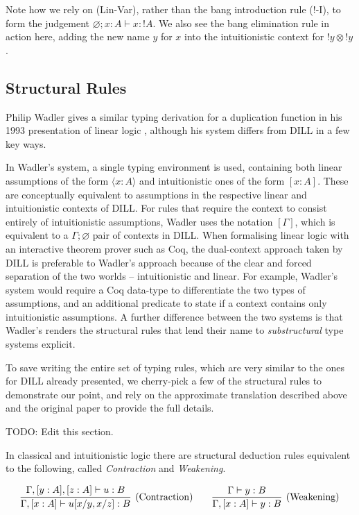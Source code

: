 \documentclass[]{unswthesis}
\let\emptyset\varnothing
\newcommand{\types}{\vdash}
\let\i\textit
\let\t\text
\begin{document}
Note how we rely on (Lin-Var), rather than the bang introduction rule (!-I), to form the judgement $\emptyset; x : A \types x : {!A}$. We also see the bang elimination rule in action here, adding the new name $y$ for $x$ into the intuitionistic context for ${!y} \otimes {!y}$.

\subsection{Structural Rules}

Philip Wadler gives a similar typing derivation for a duplication function in his 1993 presentation of linear logic \cite{wadler93}, although his system differs from DILL in a few key ways.

In Wadler's system, a single typing environment is used, containing both linear assumptions of the form $\langle x : A \rangle$ and intuitionistic ones of the form $[x : A]$. These are conceptually equivalent to assumptions in the respective linear and intuitionistic contexts of DILL. For rules that require the context to consist entirely of intuitionistic assumptions, Wadler uses the notation $[\Gamma]$, which is equivalent to a $\Gamma; \emptyset$ pair of contexts in DILL. When formalising linear logic with an interactive theorem prover such as Coq, the dual-context approach taken by DILL is preferable to Wadler's approach because of the clear and forced separation of the two worlds -- intuitionistic and linear. For example, Wadler's system would require a Coq data-type to differentiate the two types of assumptions, and an additional predicate to state if a context contains only intuitionistic assumptions. A further difference between the two systems is that Wadler's renders the structural rules that lend their name to \i{substructural} type systems explicit.

To save writing the entire set of typing rules, which are very similar to the ones for DILL already presented, we cherry-pick a few of the structural rules to demonstrate our point, and rely on the approximate translation described above and the original paper \cite{wadler93} to provide the full details.

TODO: Edit this section.

In classical and intuitionistic logic there are structural deduction rules equivalent to the following, called \i{Contraction} and \i{Weakening}.

\begin{eqnarray*}
\infer[\t{(Contraction)}]{\Gamma, [x : A] \types u[x/y, x/z] : B}{
  \Gamma, [y : A], [z : A] \types u : B
}
\qquad
\infer[\text{(Weakening)}]{\Gamma, [x : A] \types y : B}{
  \Gamma \types y : B
}
\end{eqnarray*}
\end{document}
